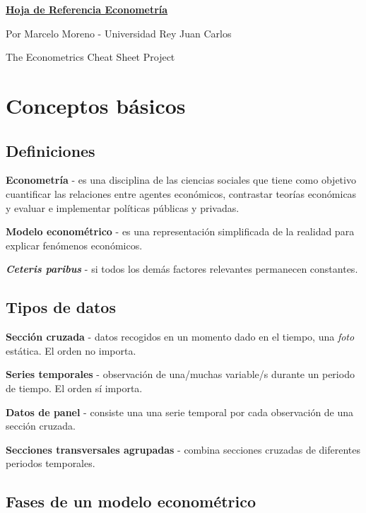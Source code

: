 \documentclass[10pt, a4paper, landscape]{article}
\begin{document}
	\begin{multicols}{3}
		\begin{center}
			\textbf{\LARGE \href{https://github.com/marcelomijas/econometrics-cheatsheet}{Hoja de Referencia Econometría}}
			
			{\footnotesize Por Marcelo Moreno - Universidad Rey Juan Carlos}
			
			{\footnotesize The Econometrics Cheat Sheet Project}
		\end{center}
		
		\section*{Conceptos básicos}
		
		\subsection*{Definiciones}
		
		\textbf{Econometría} - es una disciplina de las ciencias sociales que tiene como objetivo cuantificar las relaciones entre agentes económicos, contrastar teorías económicas y evaluar e implementar políticas públicas y privadas.
		
		\textbf{Modelo econométrico} - es una representación simplificada de la realidad para explicar fenómenos económicos.
		
		\textbf{\textsl{Ceteris paribus}} - si todos los demás factores relevantes permanecen constantes.
		
		\subsection*{Tipos de datos}
		
		\textbf{Sección cruzada} - datos recogidos en un momento dado en el tiempo, una \textsl{foto} estática. El orden no importa.
		
		\textbf{Series temporales} - observación de una/muchas variable/s durante un periodo de tiempo. El orden sí importa.
		
		\textbf{Datos de panel} - consiste una una serie temporal por cada observación de una sección cruzada.
		
		\textbf{Secciones transversales agrupadas} - combina secciones cruzadas de diferentes periodos temporales.
		
		\subsection*{Fases de un modelo econométrico}
		

\end{multicols}
\end{document}
